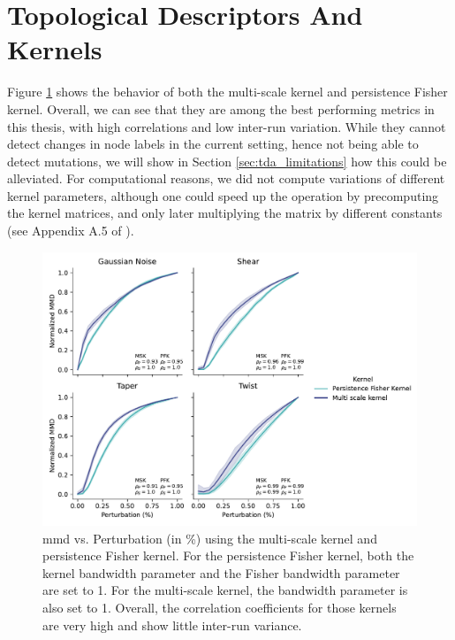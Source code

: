 \section{Topological Descriptors And Kernels}\label{sec:results_topo_kernels}

Figure \ref{fig:tda_kernels} shows the behavior of both the multi-scale kernel
and persistence Fisher kernel. Overall, we can see that they are among the best
performing metrics in this thesis, with high correlations and low inter-run
variation. While they cannot detect changes in node labels in the current
setting, hence not being able to detect mutations, we will show in Section
\ref{sec:tda_limitations} how this could be alleviated. For computational
reasons, we did not compute variations of different kernel parameters, although
one could speed up the operation by precomputing the kernel matrices, and only
later multiplying the matrix by different constants (see Appendix A.5 of
\cite{o2021evaluation}).

\begin{figure}
  \centering
  \includegraphics[width=\textwidth]{./figures/results/res_6.pdf}
  \caption[\acrshort{mmd} using topological kernels.]{\acrshort{mmd} vs. Perturbation (in \%) using the multi-scale
kernel and persistence Fisher kernel. For the persistence Fisher kernel, both
the kernel bandwidth parameter and the Fisher bandwidth parameter are set to 1.
For the multi-scale kernel, the bandwidth parameter is also set to 1. Overall,
the correlation coefficients for those kernels are very high and show little
inter-run variance.}
  \label{fig:tda_kernels}
\end{figure}


